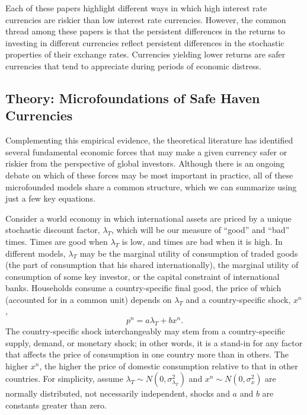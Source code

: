 \documentclass[12pt,letter]{article}
\theoremstyle{break} \theorembodyfont{\normalfont\itshape}
\theoremstyle{break}
\theoremstyle{break} \theorembodyfont{\normalfont\itshape}
\theoremstyle{break} \theorembodyfont{\normalfont\itshape}
\begin{document}
Each of these papers highlight different ways in which high interest rate currencies are riskier than low interest rate currencies. However, the 
common thread among these papers is that the persistent differences in the 
returns to investing in different currencies reflect persistent differences in the stochastic properties of their exchange rates. 
Currencies yielding lower returns are safer currencies that tend to 
appreciate during periods of economic distress. 

\subsection{Theory: Microfoundations of Safe Haven Currencies}

Complementing this empirical evidence, the theoretical literature has identified several fundamental economic forces that may make a given currency safer or riskier from the perspective of global investors. Although there is an ongoing debate on which of these forces may be most important in practice, all of these microfounded models share a common structure, which we can summarize using just a few key equations.

Consider a world economy in which international assets
are priced by a unique stochastic discount factor, $\lambda_T$, which will be our measure of ``good'' and ``bad'' times. Times are good when $\lambda_T$ is low, and times are bad when it is high. In different models, $\lambda_T$ may be the marginal utility of consumption of traded goods (the part of consumption that his shared internationally), the marginal utility of consumption of some key investor, or the capital constraint of international banks. 
Households consume a country-specific final good, the price of which (accounted for in
a common unit) depends on $\lambda_T$ and a country-specific shock,
$x^n$,
\begin{equation}
  p^{n}=a\lambda _{T}+b x^{n}.  \label{eq_RF}
\end{equation}%
The country-specific shock
interchangeably may stem from a country-specific supply, demand, or monetary shock; in
other words, it is a stand-in for any factor that affects the price of
consumption in one country more than in others. The higher $x^{n}$,
the higher the price of domestic consumption relative to that in other countries. 
For simplicity, assume $\lambda _{T}\sim N(0,\sigma^2_{\lambda_{T}})$ and
$x^{n} \sim N(0,\sigma^2_x) $ are normally distributed, not
necessarily independent, shocks and $a$ and $b$ are constants greater
than zero.
\end{document}
